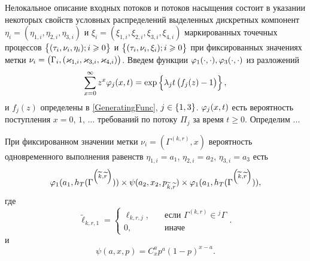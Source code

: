\documentclass[a4paper,12pt,russian]{extarticle}
\newcommand{\G}{\Gamma}
\newcommand{\ga}[1]{\Gamma^{\left( #1 \right)} }
\begin{document}
Нелокальное описание входных потоков и потоков насыщения состоит в указании некоторых свойств условных распределений выделенных дискретных компонент $\eta_i=(\eta_{1,i},\eta_{2,i}, \eta_{3,i})$ и $\xi_i=(\xi_{1,i}, \xi_{2,i}, \xi_{3,i}, \xi_{4,i})$ маркированных точечных процессов \linebreak $\left\{(\tau_i, \nu_i, \eta_i); i\geqslant 0\right\}$ и $\left\{(\tau_i, \nu_i, \xi_i); i\geqslant 0\right\}$ при фиксированных значениях метки $\nu_i = \left(\Gamma_i,(\varkappa_{1,i},\varkappa_{3,i},\varkappa_{4,i})\right)$. 
Введем функции $\varphi_1(\cdot,\cdot), \varphi_3(\cdot,\cdot)$ из разложений 
\begin{equation*}
\sum_{x=0}^{\infty} z^x\varphi_j(x,t) = \exp\left\{\lambda_j t \left(f_j(z)-1\right)\right\},
\end{equation*}
и $f_j(z)$ определены в \eqref{GeneratingFunc}, $j \in \left\{1,3\right\}$. $\varphi_j(x,t)$ есть вероятность поступления $x=0$, $1$, $\ldots$ требований по потоку $\Pi_j$ за время $t \geqslant 0$. Определим ...


При фиксированном значении метки $\nu_i=(\ga{k,r},x)$ вероятность одновременного выполнения равенств $\eta_{1,i}=a_1$, $\eta_{2,i}=a_2$, $\eta_{3,i}=a_3$ есть 
\begin{equation}
\vp_1(a_1,h_T(\ga{\widetilde{k},\widetilde{r}})) \times \psi(a_2,x_2, p_{\widetilde{k},\widetilde{r}}) \times \vp_1(a_1,h_T(\ga{\widetilde{k},\widetilde{r}})),
\label{conditionProb}
\end{equation}
где 
\begin{equation*}
\widetilde{\ell}_{k,r,1}=\begin{cases}\ell_{k,r,j},& \quad \text{если } \ga{k,r} \in {}^j\G\\0,& \quad \text{иначе}  \end{cases}.
\end{equation*}
и 
\begin{equation*}
\psi(a,x,p) =C_{x}^{a} p^a(1-p)^{x-a}.
\end{equation*}

\end{document}
